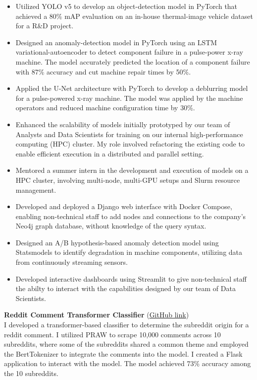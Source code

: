 \documentclass[11pt]{article}
\begin{document}
 \thispagestyle{empty}

\begin{itemize} \setlength\itemsep{-.4em}
	\item Utilized YOLO v5 to develop an
	      object-detection model in PyTorch that achieved a 80\% mAP evaluation on an
	      in-house thermal-image vehicle dataset for a R\&D project.

	\item Designed an anomaly-detection model in PyTorch using an LSTM
	      variational-autoencoder to detect component failure in a pulse-power x-ray
	      machine. The model accurately predicted the location of a component failure
	      with 87\% accuracy and cut machine repair times by 50\%.

	\item Applied the U-Net architecture with PyTorch to develop a deblurring
	      model for a pulse-powered x-ray machine. The model was applied by the
	      machine operators and reduced machine configuration time by 30\%.

	\item Enhanced the scalability of models initially prototyped by our team of
	      Analysts and Data Scientists for training on our internal high-performance
	      computing (HPC) cluster. My role involved refactoring the existing code to
	      enable efficient execution in a distributed and parallel setting.

	\item Mentored a summer intern in the development and execution of models on
	      a HPC cluster, involving multi-node, multi-GPU setups and Slurm resource
	      management.

	\item Developed and deployed a Django web interface with Docker Compose,
	      enabling non-technical staff to add nodes and connections to the company's
	      Neo4j graph database, without knowledge of the query syntax.

  \item Designed an A/B hypothesis-based anomaly detection model using
        Statsmodels to identify degradation in machine components, utilizing data from
        continuously streaming sensors. 

	\item Developed interactive dashboards using Streamlit to give
	      non-technical staff the abilty to interact with the capabilities designed
	      by our team of Data Scientists.

  \end{itemize}


\textbf{Reddit Comment Transformer Classifier}
(\href{https://github.com/nickeisenberg/reddit_classifier}{GitHub link}) \\
I developed a transformer-based classifier to determine the subreddit origin
for a reddit comment. I utilized PRAW to scrape 10,000 comments across 10
subreddits, where some of the subreddits shared a common theme and employed the
BertTokenizer to integrate the comments into the model. I created a Flask
application to interact with the model. The model achieved 73\% accuracy among
the 10 subreddits.
\end{document}
